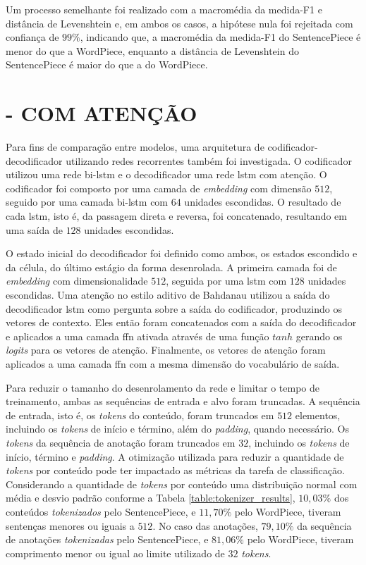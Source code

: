 Um processo semelhante foi realizado com a macromédia da medida-F1 e distância de Levenshtein e, em ambos os casos, a hipótese nula foi rejeitada com confiança de $99\%$, indicando que, a macromédia da medida-F1 do SentencePiece é menor do que a WordPiece, enquanto a distância de Levenshtein do SentencePiece é maior do que a do WordPiece.

\section{ -  COM ATENÇÃO}
\label{sec:results-bilstm-lstm}

Para fins de comparação entre modelos, uma arquitetura de codificador-decodificador utilizando redes recorrentes também foi investigada. O codificador utilizou uma rede \gls{bi-lstm} e o decodificador uma rede \gls{lstm} com atenção. O codificador foi composto por uma camada de \textit{embedding} com dimensão $512$, seguido por uma camada \gls{bi-lstm} com $64$ unidades escondidas. O resultado de cada \gls{lstm}, isto é, da passagem direta e reversa, foi concatenado, resultando em uma saída de $128$ unidades escondidas.

O estado inicial do decodificador foi definido como ambos, os estados escondido e da célula, do último estágio da forma desenrolada. A primeira camada foi de \textit{embedding} com dimensionalidade $512$, seguida por uma \gls{lstm} com $128$ unidades escondidas. Uma atenção no estilo aditivo de Bahdanau \cite{Bahdanau2016Neural} utilizou a saída do decodificador \gls{lstm} como pergunta sobre a saída do codificador, produzindo os vetores de contexto. Eles então foram concatenados com a saída do decodificador e aplicados a uma camada \gls{ffn} ativada através de uma função $tanh$ gerando os \textit{logits} para os vetores de atenção. Finalmente, os vetores de atenção foram aplicados a uma camada \gls{ffn} com a mesma dimensão do vocabulário de saída.

Para reduzir o tamanho do desenrolamento da rede e limitar o tempo de treinamento, ambas as sequências de entrada e alvo foram truncadas. A sequência de entrada, isto é, os \textit{tokens} do conteúdo, foram truncados em $512$ elementos, incluindo os \textit{tokens} de início e término, além do \textit{padding}, quando necessário. Os \textit{tokens} da sequência de anotação foram truncados em $32$, incluindo os \textit{tokens} de início, término e \textit{padding}. A otimização utilizada para reduzir a quantidade de \textit{tokens} por conteúdo pode ter impactado as métricas da tarefa de classificação. Considerando a quantidade de \textit{tokens} por conteúdo uma distribuição normal com média e desvio padrão conforme a Tabela \ref{table:tokenizer_results}, $10,03\%$ dos conteúdos \textit{tokenizados} pelo SentencePiece, e $11,70\%$ pelo WordPiece, tiveram sentenças menores ou iguais a $512$. No caso das anotações, $79,10\%$ da sequência de anotações \textit{tokenizadas} pelo SentencePiece, e $81,06\%$ pelo WordPiece, tiveram comprimento menor ou igual ao limite utilizado de $32$ \textit{tokens}.


